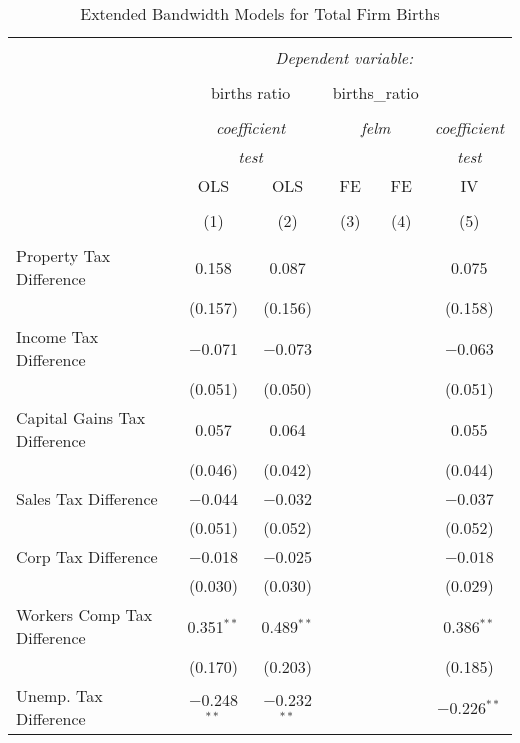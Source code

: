 
\begin{table}[!htbp] \centering 
  \caption{Extended Bandwidth Models for  Total Firm Births} 
  \label{} 
\begin{tabular}{@{\extracolsep{5pt}}lccccc} 
\\[-1.8ex]\hline 
\hline \\[-1.8ex] 
 & \multicolumn{5}{c}{\textit{Dependent variable:}} \\ 
\cline{2-6} 
\\[-1.8ex] & \multicolumn{2}{c}{births ratio} & \multicolumn{2}{c}{births\_ratio} &   \\ 
\\[-1.8ex] & \multicolumn{2}{c}{\textit{coefficient}} & \multicolumn{2}{c}{\textit{felm}} & \textit{coefficient} \\ 
 & \multicolumn{2}{c}{\textit{test}} & \multicolumn{2}{c}{\textit{}} & \textit{test} \\ 
 & OLS & OLS & FE & FE & IV \\ 
\\[-1.8ex] & (1) & (2) & (3) & (4) & (5)\\ 
\hline \\[-1.8ex] 
 Property Tax Difference & 0.158 & 0.087 &  &  & 0.075 \\ 
  & (0.157) & (0.156) &  &  & (0.158) \\ 
  Income Tax Difference & $-$0.071 & $-$0.073 &  &  & $-$0.063 \\ 
  & (0.051) & (0.050) &  &  & (0.051) \\ 
  Capital Gains Tax Difference & 0.057 & 0.064 &  &  & 0.055 \\ 
  & (0.046) & (0.042) &  &  & (0.044) \\ 
  Sales Tax Difference & $-$0.044 & $-$0.032 &  &  & $-$0.037 \\ 
  & (0.051) & (0.052) &  &  & (0.052) \\ 
  Corp Tax Difference & $-$0.018 & $-$0.025 &  &  & $-$0.018 \\ 
  & (0.030) & (0.030) &  &  & (0.029) \\ 
  Workers Comp Tax Difference & 0.351$^{**}$ & 0.489$^{**}$ &  &  & 0.386$^{**}$ \\ 
  & (0.170) & (0.203) &  &  & (0.185) \\ 
  Unemp. Tax Difference & $-$0.248$^{**}$ & $-$0.232$^{**}$ &  &  & $-$0.226$^{**}$ \\ 

\end{tabular}
\end{table}
